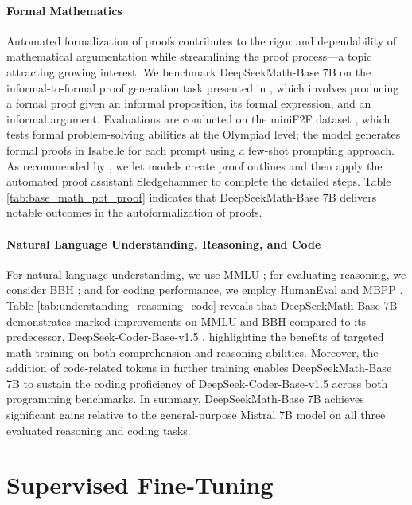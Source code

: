 \paragraph{Formal Mathematics}

Automated formalization of proofs contributes to the rigor and dependability of mathematical argumentation while streamlining the proof process—a topic attracting growing interest. We benchmark DeepSeekMath-Base 7B on the informal-to-formal proof generation task presented in \citep{dsp_proof}, which involves producing a formal proof given an informal proposition, its formal expression, and an informal argument. Evaluations are conducted on the miniF2F dataset \citep{minif2f}, which tests formal problem-solving abilities at the Olympiad level; the model generates formal proofs in Isabelle for each prompt using a few-shot prompting approach. As recommended by \cite{dsp_proof}, we let models create proof outlines and then apply the automated proof assistant Sledgehammer \citep{sledgehammer} to complete the detailed steps. Table \ref{tab:base_math_pot_proof} indicates that DeepSeekMath-Base 7B delivers notable outcomes in the autoformalization of proofs.

\paragraph{Natural Language Understanding, Reasoning, and Code}

For natural language understanding, we use MMLU \citep{mmlu}; for evaluating reasoning, we consider BBH \citep{bbh}; and for coding performance, we employ HumanEval \citep{codex} and MBPP \citep{mbpp}. Table \ref{tab:understanding_reasoning_code} reveals that DeepSeekMath-Base 7B demonstrates marked improvements on MMLU and BBH compared to its predecessor, DeepSeek-Coder-Base-v1.5 \citep{deepseek-coder}, highlighting the benefits of targeted math training on both comprehension and reasoning abilities. Moreover, the addition of code-related tokens in further training enables DeepSeekMath-Base 7B to sustain the coding proficiency of DeepSeek-Coder-Base-v1.5 across both programming benchmarks. In summary, DeepSeekMath-Base 7B achieves significant gains relative to the general-purpose Mistral 7B \citep{mistral} model on all three evaluated reasoning and coding tasks.

\section{Supervised Fine-Tuning}

